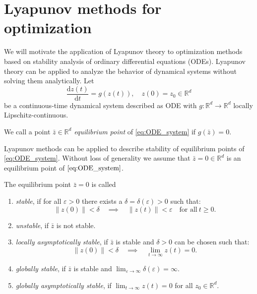 \documentclass[12pt,openany]{book}
\theoremstyle{definition}
\theoremstyle{definition}
\newcommand{\R}{\mathbb{R}}
\newcommand{\dd}{{\mathrm{d}}}
\begin{document}
\section{Lyapunov methods for optimization}\label{app:Lyapunov}
We will motivate the application of Lyapunov theory to optimization methods based on stability analysis of ordinary differential equations (ODEs). Lyapunov theory can be applied to analyze the behavior of dynamical systems without solving them analytically.  Let 
\begin{equation}\label{eq:ODE_system}
\frac{\dd z(t)}{\dd t} = g(z(t)),\quad z(0) = z_0\in\R^d
\end{equation}
be a continuous-time dynamical system described as ODE with $g:\R^d\to\R^d$ locally Lipschitz-continuous.  
\begin{defi}
We call a point $\bar z\in\R^d$ \textit{equilibrium point} of \eqref{eq:ODE_system} if $g(\bar z)=0$.
\end{defi}
Lyapunov methods can be applied to describe stability of equilibrium points of \eqref{eq:ODE_system}. Without loss of generality we  assume that $\bar z=0\in\R^d$ is an equilibrium point of $\eqref{eq:ODE_system}$.
\begin{defi}
The equilibrium point $\bar z=0$ is called
\begin{enumerate}
\item \textit{stable}, if for all $\varepsilon>0$ there exists a $\delta=\delta(\varepsilon)>0$ such that:
\[\|z(0)\|<\delta \quad \implies \quad \|z(t)\|<\varepsilon \quad\text{for all}\ t\ge0. \]
\item \textit{unstable}, if $\bar z$ is not stable. 
\item \textit{locally asymptotically stable}, if $\bar z$ is stable and $\delta>0$ can be chosen such that:
\[\|z(0)\|<\delta \quad \implies \quad \lim_{t\to\infty} z(t) = 0. \]
\item \textit{globally stable}, if $\bar z$ is stable and $\lim_{\varepsilon\to\infty}\delta(\varepsilon)=\infty$.
\item \textit{globally asymptotically stable}, if $\lim_{t\to\infty} z(t) = 0$ for all $z_0\in\R^d$.
\end{enumerate}
\end{defi}
\end{document}
